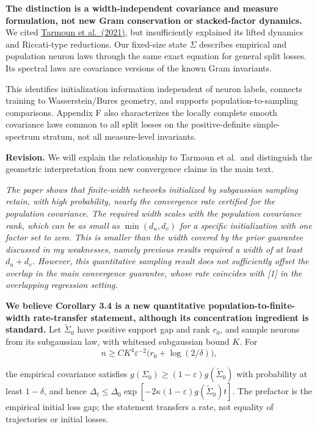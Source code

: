 \documentclass[11pt,a4paper]{article}
\renewenvironment{quote}
  {\par\addvspace{0.8em}\Needspace{8\baselineskip}%
    \list{}{\leftmargin=1.2em\rightmargin=0pt\topsep=0.25em
    \parsep=0.3em}\item\relax\normalsize\itshape\color{quotegray}}
  {\endlist\nopagebreak[4]}
\begin{document}
\textbf{The distinction is a width-independent covariance and measure formulation, not new Gram conservation or stacked-factor dynamics.} We cited \href{https://proceedings.mlr.press/v139/tarmoun21a/tarmoun21a.pdf}{Tarmoun et al.~(2021)}, but insufficiently explained its lifted dynamics and Riccati-type reductions. Our fixed-size state \(\Sigma\) describes empirical and population neuron laws through the same exact equation for general split losses. Its spectral laws are covariance versions of the known Gram invariants.

This identifies initialization information independent of neuron labels, connects training to Wasserstein/Bures geometry, and supports population-to-sampling comparisons. Appendix F also characterizes the locally complete smooth covariance laws common to all split losses on the positive-definite simple-spectrum stratum, not all measure-level invariants.

\textbf{Revision.} We will explain the relationship to Tarmoun et al.~and distinguish the geometric interpretation from new convergence claims in the main text.

\begin{quote}
The paper shows that finite-width networks initialized by subgaussian sampling retain, with high probability, nearly the convergence rate certified for the population covariance. The required width scales with the population covariance rank, which can be as small as \(\min(d_u,d_v)\) for a specific initialization with one factor set to zero. This is smaller than the width covered by the prior guarantee discussed in my weaknesses, namely previous results required a width of at least \(d_u+d_v\). However, this quantitative sampling result does not sufficiently offset the overlap in the main convergence guarantee, whose rate coincides with {[}1{]} in the overlapping regression setting.
\end{quote}

\textbf{We believe Corollary 3.4 is a new quantitative population-to-finite-width rate-transfer statement, although its concentration ingredient is standard.} Let \(\widetilde\Sigma_0\) have positive support gap and rank \(r_0\), and sample neurons from its subgaussian law, with whitened subgaussian bound \(K\). For
\[
n\ge CK^4\varepsilon^{-2}\bigl(r_0+\log(2/\delta)\bigr),
\]

the empirical covariance satisfies \(g(\Sigma_0)\ge(1-\varepsilon)g(\widetilde\Sigma_0)\) with probability at least \(1-\delta\), and hence \(\Delta_t\le\Delta_0\exp[-2\kappa(1-\varepsilon)g(\widetilde\Sigma_0)t]\). The prefactor is the empirical initial loss gap; the statement transfers a rate, not equality of trajectories or initial losses.
\end{document}
